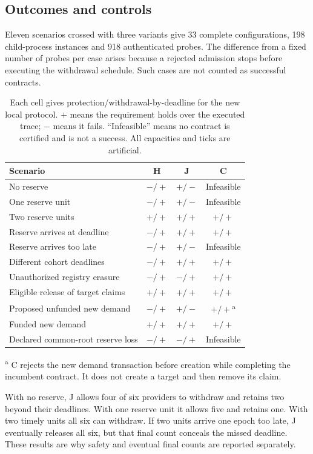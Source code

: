 \subsection{Outcomes and controls}
Eleven scenarios crossed with three variants give 33 complete configurations, 198 child-process instances and 918 authenticated probes. The difference from a fixed number of probes per case arises because a rejected admission stops before executing the withdrawal schedule. Such cases are not counted as successful contracts.

\begin{table}[t]
\centering\small
\caption{Each cell gives protection/withdrawal-by-deadline for the new local protocol. $+$ means the requirement holds over the executed trace; $-$ means it fails. ``Infeasible'' means no contract is certified and is not a success. All capacities and ticks are artificial.}
\label{tab:protocol}
\begin{tabularx}{\linewidth}{@{}Xccc@{}}\toprule
Scenario & H & J & C\\\midrule
No reserve & $-/+$ & $+/-$ & Infeasible\\
One reserve unit & $-/+$ & $+/-$ & Infeasible\\
Two reserve units & $+/+$ & $+/+$ & $+/+$\\
Reserve arrives at deadline & $-/+$ & $+/+$ & $+/+$\\
Reserve arrives too late & $-/+$ & $+/-$ & Infeasible\\
Different cohort deadlines & $-/+$ & $+/+$ & $+/+$\\
Unauthorized registry erasure & $-/+$ & $-/+$ & $+/+$\\
Eligible release of target claims & $+/+$ & $+/+$ & $+/+$\\
Proposed unfunded new demand & $-/+$ & $+/-$ & $+/+$\textsuperscript{a}\\
Funded new demand & $+/+$ & $+/+$ & $+/+$\\
Declared common-root reserve loss & $-/+$ & $-/+$ & Infeasible\\\bottomrule
\end{tabularx}
\vspace{3pt}\parbox{\linewidth}{\footnotesize\textsuperscript{a} C rejects the new demand transaction before creation while completing the incumbent contract. It does not create a target and then remove its claim.}
\end{table}
With no reserve, J allows four of six providers to withdraw and retains two beyond their deadlines. With one reserve unit it allows five and retains one. With two timely units all six can withdraw. If two units arrive one epoch too late, J eventually releases all six, but that final count conceals the missed deadline. These results are why safety and eventual final counts are reported separately.

